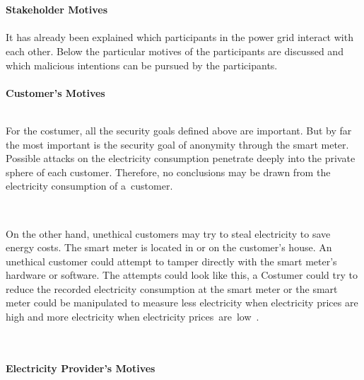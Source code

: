 \\
\\
\textbf{Stakeholder Motives}
\\
\\
It has already been explained which participants in the power grid interact with each other. %
Below the particular motives of the participants are discussed and which malicious intentions can be pursued by the participants.
\\
\\
\textbf{Customer's Motives}
\\
\\
\begin{samepage}\enlargethispage{\baselineskip}
For the costumer, all the security goals defined above are important. But by far the most important is the security goal of anonymity through the smart meter. Possible attacks on the electricity consumption penetrate deeply into the private sphere of each customer. Therefore, no conclusions may be drawn from the electricity consumption of a~customer. \end{samepage}\\
\begin{samepage}\enlargethispage{\baselineskip}On the other hand, unethical customers may try to steal electricity to save energy costs. The smart meter is located in or on the customer's house. An unethical customer could attempt to tamper directly with the smart meter's hardware or software. The attempts could look like this, a Costumer could try to reduce the recorded electricity consumption at the smart meter or the smart meter could be manipulated to measure less electricity when electricity prices are high and more electricity when electricity \nopagebreak prices~are~low~\cite{lemay2007unified}.\nopagebreak
\end{samepage}
\\
\\
\textbf{Electricity Provider's Motives}
\\
\\

